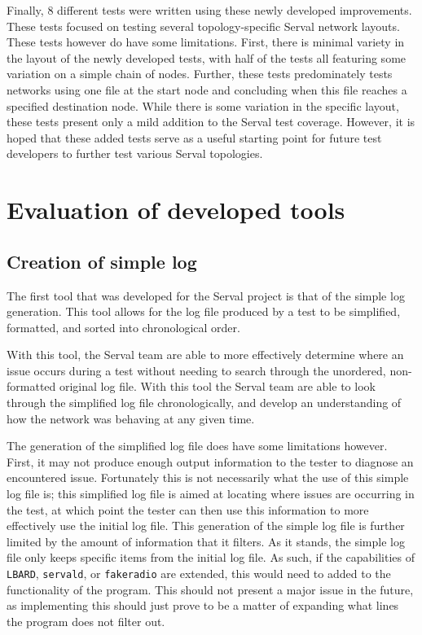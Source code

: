 Finally, 8 different tests were written using these newly developed improvements.
These tests focused on testing several topology-specific Serval network layouts.
These tests however do have some limitations. 
First, there is minimal variety in the layout of the newly developed tests, with half of the tests all featuring some variation on a simple chain of nodes.
Further, these tests predominately tests networks using one file at the start node and concluding when this file reaches a specified destination node.
While there is some variation in the specific layout, these tests present only a mild addition to the Serval test coverage.
However, it is hoped that these added tests serve as a useful starting point for future test developers to further test various Serval topologies.


\section{Evaluation of developed tools}

\subsection{Creation of simple log}
The first tool that was developed for the Serval project is that of the simple log generation.
This tool allows for the log file produced by a test to be simplified, formatted, and sorted into chronological order.

With this tool, the Serval team are able to more effectively determine where an issue occurs during a test without needing to search through the unordered, non-formatted original log file.
With this tool the Serval team are able to look through the simplified log file chronologically, and develop an understanding of how the network was behaving at any given time.

The generation of the simplified log file does have some limitations however.
First, it may not produce enough output information to the tester to diagnose an encountered issue.
Fortunately this is not necessarily what the use of this simple log file is; this simplified log file is aimed at locating where issues are occurring in the test, at which point the tester can then use this information to more effectively use the initial log file.
This generation of the simple log file is further limited by the amount of information that it filters.
As it stands, the simple log file only keeps specific items from the initial log file.
As such, if the capabilities of \texttt{LBARD}, \texttt{servald}, or \texttt{fakeradio} are extended, this would need to added to the functionality of the program.
This should not present a major issue in the future, as implementing this should just prove to be a matter of expanding what lines the program does not filter out.

